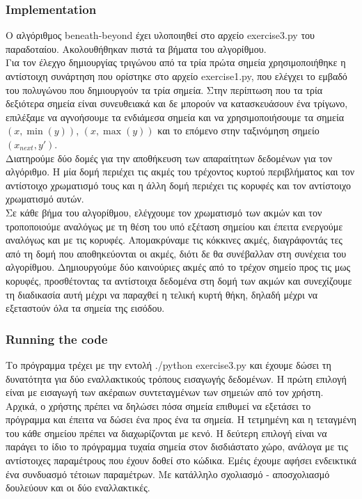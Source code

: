 \documentclass[12pt]{article}
\begin{document}
\subsubsection*{Implementation}

Ο αλγόριθμος beneath-beyond έχει υλοποιηθεί στο αρχείο exercise3.py του παραδοταίου. Ακολουθήθηκαν πιστά τα βήματα του αλγορίθμου. \\

Για τον έλεχγο δημιουργίας τριγώνου από τα τρία πρώτα σημεία χρησιμοποιήθηκε η αντίστοιχη συνάρτηση που ορίστηκε στο αρχείο exercise1.py, που ελέγχει το εμβαδό του πολυγώνου που δημιουργούν τα τρία σημεία. Στην περίπτωση που τα τρία δεξιότερα σημεία είναι συνευθειακά και δε μπορούν να κατασκευάσουν ένα τρίγωνο, επιλέξαμε να αγνοήσουμε τα ενδιάμεσα σημεία και να χρησιμοποιήσουμε τα σημεία \((x, \min(y))\), \((x, \max(y))\) και το επόμενο στην ταξινόμηση σημείο \((x_{next}, y')\). \\

Διατηρούμε δύο δομές για την αποθήκευση των απαραίτητων δεδομένων για τον αλγόριθμο. Η μία δομή περιέχει τις ακμές του τρέχοντος κυρτού περιβλήματος και τον αντίστοιχο χρωματισμό τους και η άλλη δομή περιέχει τις κορυφές και τον αντίστοιχο χρωματισμό αυτών. \\

Σε κάθε βήμα του αλγορίθμου, ελέγχουμε τον χρωματισμό των ακμών και τον τροποποιούμε αναλόγως με τη θέση του υπό εξέταση σημείου και έπειτα ενεργούμε αναλόγως και με τις κορυφές. Απομακρύναμε τις κόκκινες ακμές, διαγράφοντάς τες από τη δομή που αποθηκεύονται οι ακμές, διότι δε θα συνέβαλλαν στη συνέχεια του αλγορίθμου. Δημιουργούμε δύο καινούριες ακμές από το τρέχον σημείο προς τις μως κορυφές, προσθέτοντας τα αντίστοιχα δεδομένα στη δομή των ακμών και συνεχίζουμε τη διαδικασία αυτή μέχρι να παραχθεί η τελική κυρτή θήκη, δηλαδή μέχρι να εξεταστούν όλα τα σημεία της εισόδου. \\

\subsubsection*{Running the code}

Το πρόγραμμα τρέχει με την εντολή ./python exercise3.py και έχουμε δώσει τη δυνατότητα για δύο εναλλακτικούς τρόπους εισαγωγής δεδομένων. Η πρώτη επιλογή είναι με εισαγωγή των ακέραιων συντεταγμένων των σημειών από τον χρήστη. Αρχικά, ο χρήστης πρέπει να δηλώσει πόσα σημεία επιθυμεί να εξετάσει το πρόγραμμα και έπειτα να δώσει ένα προς ένα τα σημεία. Η τετμημένη και η τεταγμένη του κάθε σημείου πρέπει να διαχωρίζονται με κενό. Η δεύτερη επιλογή είναι να παράγει το ίδιο το πρόγραμμα τυχαία σημεία στον δισδιάστατο χώρο, ανάλογα με τις αντίστοιχες παραμέτρους που έχουν δοθεί στο κώδικα. Εμέις έχουμε αφήσει ενδεικτικά ένα συνδυασμό τέτοιων παραμέτρων. Με κατάλληλο σχολιασμό - αποσχολιασμό δουλεύουν και οι δύο εναλλακτικές. \\
\end{document}
